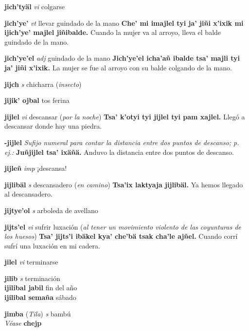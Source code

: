\documentclass[10pt]{scrbook}
\newcommand{\entry}[1]{\textbf{#1}}
\newcommand{\nontranslationdef}[1]{\textit{#1}}
\newcommand{\partofspeech}[1]{\textit{#1}}
\newcommand{\spanishtranslation}[1]{#1}
\newcommand{\clarification}[1]{(\textit{#1})}
\newcommand{\cholexample}[1]{\textbf{#1}}
\newcommand{\exampletranslation}[1]{#1}
\newcommand{\alsosee}[1]{\\\textit{Véase} \textbf{#1}}
\newcommand{\relevantdialect}[1]{(\textit{#1})}
\newcommand{\secondaryentry}[1]{\\\textbf{#1}}
\newcommand{\secondtranslation}[1]{#1}
\begin{document}
\begin{multicols}{2}
\entry{jich'tyäl}
\partofspeech{vi}
\spanishtranslation{colgarse}

\entry{jich'ye'}
\partofspeech{vt}
\spanishtranslation{llevar guindado de la mano}
\cholexample{Che' mi imajlel tyi ja' jiñi x'ixik mi ijich'ye' majlel jiñibalde.}
\exampletranslation{Cuando la mujer va al arroyo, lleva el balde guindado de la mano.}

\entry{jich'ye'el}
\partofspeech{adj}
\spanishtranslation{guindado de la mano}
\cholexample{Jich'ye'el icha'añ ibalde tsa' majli tyi ja' jiñi x'ixik.}
\exampletranslation{La mujer se fue al arroyo con su balde colgando de la mano.}

\entry{jijch}
\partofspeech{s}
\spanishtranslation{chicharra}
\clarification{insecto}

\entry{jijik' ojbal}
\spanishtranslation{tos ferina}

\entry{jijlel}
\partofspeech{vi}
\spanishtranslation{descansar}
\clarification{por la noche}
\cholexample{Tsa' k'otyi tyi jijlel tyi pam xajlel.}
\exampletranslation{Llegó a descansar donde hay una piedra.}

\entry{-jijlel}
\nontranslationdef{Sufijo numeral para contar la distancia entre dos puntos de descanso; p. ej.:}
\cholexample{Juñjijlel tsa' ixäñä.}
\exampletranslation{Anduvo la distancia entre dos puntos de descanso.}

\entry{jijleñ}
\partofspeech{imp}
\spanishtranslation{¡descansa!}

\entry{jijlibäl}
\partofspeech{s}
\spanishtranslation{descansadero}
\clarification{en camino}
\cholexample{Tsa'ix laktyaja jijlibäl.}
\exampletranslation{Ya hemos llegado al descansadero.}

\entry{jijtye'ol}
\partofspeech{s}
\spanishtranslation{arboleda de avellano}

\entry{jijts'el}
\partofspeech{vi}
\spanishtranslation{sufrir luxación}
\clarification{al tener un movimiento violento de las coyunturas de los huesos}
\cholexample{Tsa' jijts'i ibäkel kya' che'bä tsak cha'le ajñel.}
\exampletranslation{Cuando corrí sufrí una luxación en mi cadera.}

\entry{jilel}
\partofspeech{vi}
\spanishtranslation{terminarse}

\entry{jilib}
\partofspeech{s}
\spanishtranslation{terminación}
\secondaryentry{ijilibal jabil}
\secondtranslation{fin del año}
\secondaryentry{ijilibal semaña}
\secondtranslation{sábado}

\entry{jimba}
\relevantdialect{Tila}
\partofspeech{s}
\spanishtranslation{bambú}
\alsosee{chejp}


\end{multicols}
\end{document}
